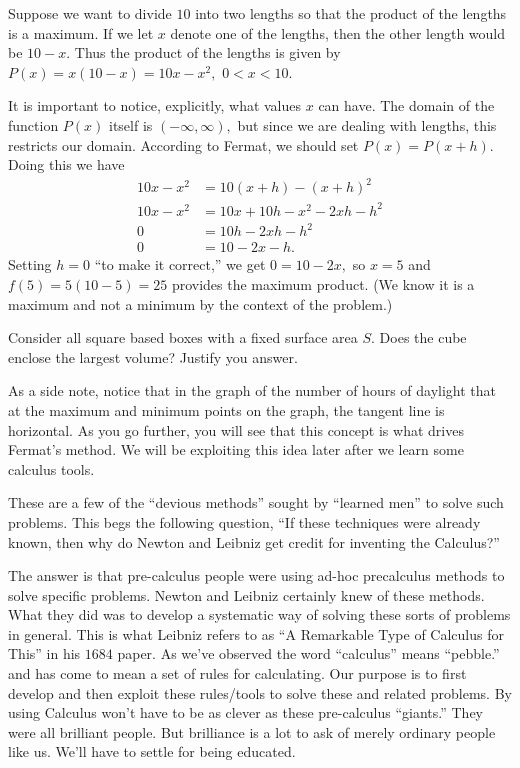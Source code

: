 Suppose we want to divide $10$ into two lengths so that the product of
the lengths is a maximum.  If we let $x$ denote one of the lengths, then
the other length would be $10-x.$  Thus the product of the lengths is
given by $P(x)=x(10-x)=10x-x^2,$ $0<x<10.$

It is important to notice, explicitly, what  values $x$ can have.
The domain of the function $P(x)$ itself is $(-\infty,\infty),$ but
since we are dealing with lengths, this restricts our domain.
According to Fermat, we should set $P(x)=P(x+h).$ Doing this we have
\begin{align*}
  10x-x^2&=10(x+h)-(x+h)^2\\
  10x-x^2&=10x+10h-x^2-2xh-h^2\\
  0&=10h-2xh-h^2\\
  0&=10-2x-h.
\end{align*}
Setting $h=0$ ``to make it correct,'' we get $0=10-2x,$ so $x=5$ and
$f(5)=5(10-5)=25$ 
provides the maximum product.  (We know it is a maximum and not a
minimum by the context of the problem.)

\begin{embeddedproblem}{}
  Consider all square based boxes with a fixed surface area $S.$
  Does the cube enclose the largest volume?  Justify you answer.
\end{embeddedproblem}

As a side note, notice that in the graph of the number of hours of
daylight that at the maximum and minimum points on the graph, the
tangent line is horizontal.  As you go further, you will see that this
concept is what drives Fermat's method.  We will be exploiting this
idea later after we learn some calculus tools.

These are a few of the ``devious methods''
sought by ``learned men'' to solve such problems.  This begs the
following question, ``If these techniques were already known, then why
do Newton and Leibniz get credit for inventing the Calculus?''


The answer is that pre-calculus people were using ad-hoc precalculus
methods to solve specific problems.  Newton and Leibniz certainly knew
of these methods.  What they did was to develop a systematic way of
solving these sorts of problems in general.  This is what Leibniz
refers to as ``A Remarkable Type of Calculus for This'' in his $1684$
paper. As we've observed the word ``calculus'' means ``pebble.'' and has
come to mean a set of rules for calculating.  Our purpose is to first
develop and then
exploit these rules/tools to solve these and related problems. By
using Calculus won't have to be as clever as these pre-calculus
``giants.''  They were all brilliant people. But brilliance is a lot
to ask of merely ordinary people like us. We'll have to settle for
being educated.




